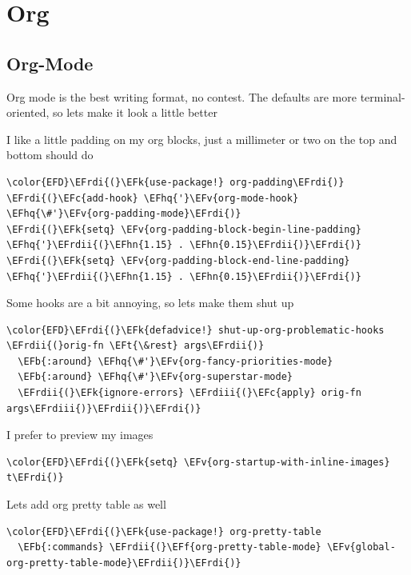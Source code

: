 \documentclass{scrartcl}
\newcommand{\EFk}[1]{\textcolor{EFk}{#1}} %
\newcommand{\EFt}[1]{\textcolor{EFt}{#1}} %
\newcommand{\EFb}[1]{\textcolor{EFb}{#1}} %
\newcommand{\EFc}[1]{\textcolor{EFc}{#1}} %
\newcommand{\EFv}[1]{\textcolor{EFv}{#1}} %
\newcommand{\EFf}[1]{\textcolor{EFf}{#1}} %
\newcommand{\EFhn}[1]{\textcolor{EFhn}{\textbf{#1}}} %
\newcommand{\EFhq}[1]{\textcolor{EFhq}{#1}} %
\newcommand{\EFrdi}[1]{\textcolor{EFrdi}{#1}} %
\newcommand{\EFrdii}[1]{\textcolor{EFrdii}{#1}} %
\newcommand{\EFrdiii}[1]{\textcolor{EFrdiii}{#1}} %
\begin{document}
\section{Org}
\label{sec:orgfd0c862}
\subsection{Org-Mode}
\label{sec:org24d2c74}
Org mode is the best writing format, no contest. The defaults are more
terminal-oriented, so lets make it look a little better

I like a little padding on my org blocks, just a millimeter or two on the top and bottom should do
\begin{Code}
\begin{Verbatim}[]
\color{EFD}\EFrdi{(}\EFk{use-package!} org-padding\EFrdi{)}
\EFrdi{(}\EFc{add-hook} \EFhq{'}\EFv{org-mode-hook} \EFhq{\#'}\EFv{org-padding-mode}\EFrdi{)}
\EFrdi{(}\EFk{setq} \EFv{org-padding-block-begin-line-padding} \EFhq{'}\EFrdii{(}\EFhn{1.15} . \EFhn{0.15}\EFrdii{)}\EFrdi{)}
\EFrdi{(}\EFk{setq} \EFv{org-padding-block-end-line-padding} \EFhq{'}\EFrdii{(}\EFhn{1.15} . \EFhn{0.15}\EFrdii{)}\EFrdi{)}
\end{Verbatim}
\end{Code}

Some hooks are a bit annoying, so lets make them shut up
\begin{Code}
\begin{Verbatim}[]
\color{EFD}\EFrdi{(}\EFk{defadvice!} shut-up-org-problematic-hooks \EFrdii{(}orig-fn \EFt{\&rest} args\EFrdii{)}
  \EFb{:around} \EFhq{\#'}\EFv{org-fancy-priorities-mode}
  \EFb{:around} \EFhq{\#'}\EFv{org-superstar-mode}
  \EFrdii{(}\EFk{ignore-errors} \EFrdiii{(}\EFc{apply} orig-fn args\EFrdiii{)}\EFrdii{)}\EFrdi{)}
\end{Verbatim}
\end{Code}

I prefer to preview my images
\begin{Code}
\begin{Verbatim}[]
\color{EFD}\EFrdi{(}\EFk{setq} \EFv{org-startup-with-inline-images} t\EFrdi{)}
\end{Verbatim}
\end{Code}

Lets add org pretty table as well
\begin{Code}
\begin{Verbatim}[]
\color{EFD}\EFrdi{(}\EFk{use-package!} org-pretty-table
  \EFb{:commands} \EFrdii{(}\EFf{org-pretty-table-mode} \EFv{global-org-pretty-table-mode}\EFrdii{)}\EFrdi{)}
\end{Verbatim}
\end{Code}
\end{document}
